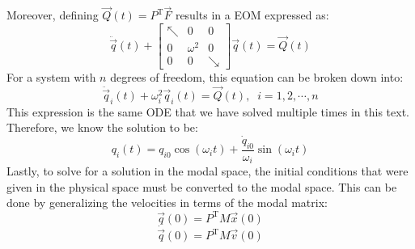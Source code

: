 \documentclass[12pt,letter]{article}
\numberwithin{ex}{section} %
\numberwithin{re}{section} %
\begin{document}
Moreover, defining $\vec{Q}(t) = P^{\text{T}} \vec{F}$ results in a EOM expressed as:
\begin{equation}
\ddot{\vec{q}}(t) +  \begin{bmatrix} \nwarrow & 0 & 0 \\  0  & \omega^2 & 0 \\  0  & 0 & \searrow \end{bmatrix} \vec{q}(t) = \vec{Q}(t)
\end{equation}
For a system with $n$ degrees of freedom, this equation can be broken down into:
\begin{equation}
\ddot{\vec{q}}_i(t) + \omega_i^2 \vec{q}_i (t) =  \vec{Q}(t), \; \; i=1,2, \cdots, n
\end{equation}
This expression is the same ODE that we have solved multiple times in this text. Therefore, we know the solution to be:
\begin{equation}
q_i(t) = q_{i0} \cos(\omega_i t) +  \frac{\dot{q}_{i0}}{\omega_i} \sin( \omega_i t)
\end{equation}
Lastly, to solve for a solution in the modal space, the initial conditions that were given in the physical space must be converted to the modal space. This can be done by generalizing the velocities in terms of the modal matrix:
\begin{equation}
\vec{q}(0) = P^\text{T} M \vec{x}(0)
\end{equation}
\begin{equation}
\dot{\vec{q}}(0) = P^\text{T} M \vec{v}(0)
\end{equation}


\end{document}
